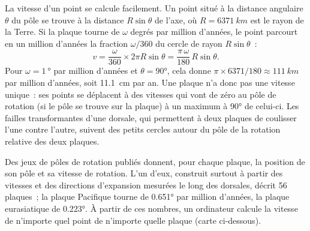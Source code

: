 La vitesse d'un point se calcule facilement. Un point situé à la distance
angulaire $\theta$ du pôle se trouve à la distance $R\sin\theta$ de l'axe,
où $R = \qty{6371}{km}$ est le rayon de la Terre. Si la plaque tourne de
$\omega$ degrés par million d'années, le point parcourt en un million
d'années la fraction $\omega/360$ du cercle de rayon $R\sin\theta$~:
\[
  v = \frac{\omega}{360} \times 2\pi R\sin\theta
    = \frac{\pi\,\omega}{180}\,R\sin\theta .
\]
Pour $\omega = \qty{1}{\degree}$ par million d'années et $\theta = \ang{90}$,
cela donne $\pi \times 6371/180 \approx \qty{111}{km}$ par million d'années,
soit \qty{11.1}{cm} par an. Une plaque n'a donc pas une vitesse unique~: ses
points se déplacent à des vitesses qui vont de zéro au pôle de rotation (si
le pôle se trouve sur la plaque) à un maximum à \ang{90} de celui-ci. Les
failles transformantes d'une dorsale, qui permettent à deux plaques de
coulisser l'une contre l'autre, suivent des petits cercles autour du pôle de
la rotation relative des deux plaques.

Des jeux de pôles de rotation publiés donnent, pour chaque plaque, la
position de son pôle et sa vitesse de rotation. L'un d'eux, construit
surtout à partir des vitesses et des directions d'expansion mesurées le long
des dorsales, décrit 56 plaques~; la plaque Pacifique tourne de
\ang{0.651} par million d'années, la plaque eurasiatique de \ang{0.223}. À
partir de ces nombres, un ordinateur calcule la vitesse de n'importe quel
point de n'importe quelle plaque (carte ci-dessous).

